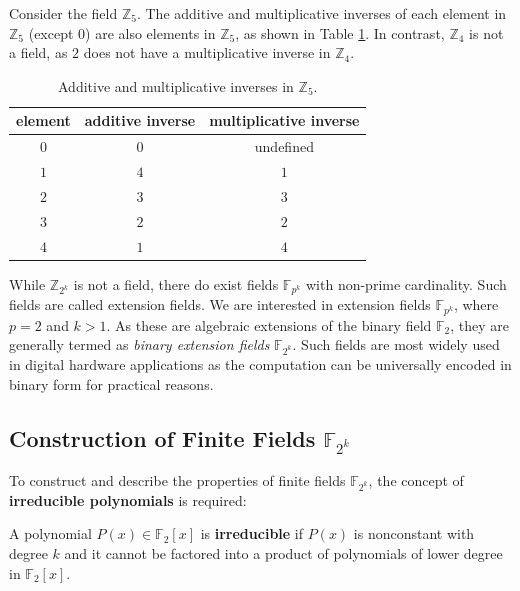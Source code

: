 \begin{Example}
	Consider the field $\mathbb{Z}_5$. The additive and multiplicative inverses of each element 
	in $\mathbb{Z}_5$ (except $0$) are also elements in $\mathbb{Z}_5$, as shown in Table \ref{tab:z5}.
	In contrast, $\mathbb{Z}_4$ is not a field, as $2$ does not have a multiplicative inverse in $\mathbb{Z}_4$.
	\begin{table}[t]
	\begin{center}
	\caption{Additive and multiplicative inverses in $\mathbb{Z}_5$.}\label{tab:z5} 
	\begin{tabular}{|c||c|c|} 
	\hline
	element & additive inverse & multiplicative inverse    \\
	\hline
	$0$        & $0$         & undefined\\
	\hline
	$1$        & $4$         & $1$           \\
	\hline
	$2$        & $3$    	& $3$      \\
	\hline
	$3$        & $2$		& $2$  \\
	\hline
	$4$        & $1$  		& $4$    \\
	\hline
	\end{tabular}
	\end{center}
	\end{table}
\end{Example}


While $\mathbb{Z}_{2^k}$ is not a field, there do exist fields $\mathbb{F}_{p^k}$ with non-prime cardinality. 
Such fields are called extension fields. 
We are interested in extension fields $\mathbb{F}_{p^k}$, where $p = 2$ and $k >1$. 
As these are algebraic extensions of the binary field $\mathbb{F}_{2}$, they are generally termed as {\it binary extension fields} $\mathbb{F}_{2^k}$. 
Such fields are most widely used in digital hardware applications as the computation can be universally encoded in binary form for practical reasons. 

\subsection{Construction of Finite Fields $\mathbb{F}_{2^k}$}
To construct and describe the properties of finite fields $\mathbb{F}_{2^k}$,  the concept of {\bf irreducible polynomials} is required:
\begin{Definition}
A polynomial $P(x) \in \mathbb{F}_{2}\left[x\right]$ is {\bf irreducible} if $P(x)$ is nonconstant with degree $k$ and it cannot be 
factored into a product of polynomials of lower degree in $\mathbb{F}_2[x]$.
\end{Definition}

